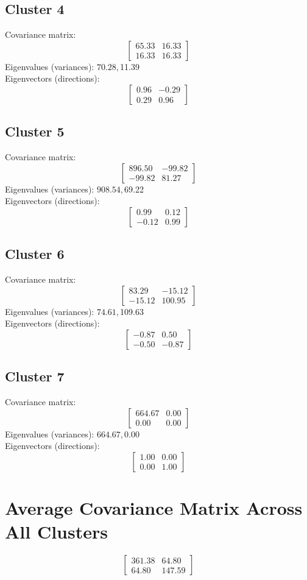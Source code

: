 \documentclass{article}
\begin{document}
\subsection*{Cluster 4}
Covariance matrix:
\[\begin{bmatrix}65.33 & 16.33 \\16.33 & 16.33\end{bmatrix}\]
Eigenvalues (variances): $ 70.28, $11.39\\
Eigenvectors (directions):
\[\begin{bmatrix}0.96 & -0.29 \\0.29 & 0.96\end{bmatrix}\]
\subsection*{Cluster 5}
Covariance matrix:
\[\begin{bmatrix}896.50 & -99.82 \\-99.82 & 81.27\end{bmatrix}\]
Eigenvalues (variances): $ 908.54, $69.22\\
Eigenvectors (directions):
\[\begin{bmatrix}0.99 & 0.12 \\-0.12 & 0.99\end{bmatrix}\]
\subsection*{Cluster 6}
Covariance matrix:
\[\begin{bmatrix}83.29 & -15.12 \\-15.12 & 100.95\end{bmatrix}\]
Eigenvalues (variances): $ 74.61, $109.63\\
Eigenvectors (directions):
\[\begin{bmatrix}-0.87 & 0.50 \\-0.50 & -0.87\end{bmatrix}\]
\subsection*{Cluster 7}
Covariance matrix:
\[\begin{bmatrix}664.67 & 0.00 \\0.00 & 0.00\end{bmatrix}\]
Eigenvalues (variances): $ 664.67, $0.00\\
Eigenvectors (directions):
\[\begin{bmatrix}1.00 & 0.00 \\0.00 & 1.00\end{bmatrix}\]
\section*{Average Covariance Matrix Across All Clusters}
\[\begin{bmatrix}361.38 & 64.80 \\64.80 & 147.59\end{bmatrix}\]
\end{document}

